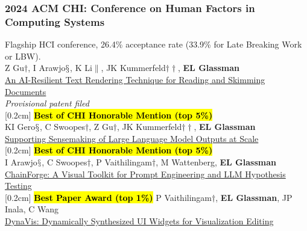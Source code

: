 \documentclass[10pt, a4paper]{article}
\newcommand{\years}[1]{\marginnote{\normalsize #1}}
\begin{document}

\subsubsection*{2024 ACM \textbf{CHI}: Conference on Human Factors in Computing Systems}
Flagship HCI conference, 26.4\% acceptance rate (33.9\% for Late Breaking Work or LBW).\\

\years{\textbf{C35}} Z Gu$\dagger$, I Arawjo$\mathsection$, K Li$\|$, JK Kummerfeld$\dagger\dagger$, \textbf{EL Glassman}\\ \href{https://glassmanlab.seas.harvard.edu/papers/gptsm.pdf}{An AI-Resilient Text Rendering Technique for Reading and Skimming Documents}\\
\textit{Provisional patent filed}\\
[0.2cm]
\years{\textbf{C34}}\hl{\textbf{Best of CHI Honorable Mention (top 5\%)}}\\ KI Gero$\mathsection$, C Swoopes$\dagger$, Z Gu$\dagger$, JK Kummerfeld$\dagger\dagger$, \textbf{EL Glassman}\\ \href{https://glassmanlab.seas.harvard.edu/papers/mesotext.pdf}{Supporting Sensemaking of Large Language Model Outputs at Scale}\\
[0.2cm]
\years{\textbf{C33}}\hl{\textbf{Best of CHI Honorable Mention (top 5\%)}}\\ I Arawjo$\mathsection$, C Swoopes$\dagger$, P Vaithilingam$\dagger$, M Wattenberg, \textbf{EL Glassman}\\ \href{https://glassmanlab.seas.harvard.edu/papers/chainforge.pdf}{ChainForge: A Visual Toolkit for Prompt Engineering and LLM Hypothesis Testing}\\
[0.2cm]
\years{\textbf{C32}}\hl{\textbf{Best Paper Award (top 1\%)}} P Vaithilingam$\dagger$, \textbf{EL Glassman}, JP Inala, C Wang\\ \href{https://glassmanlab.seas.harvard.edu/papers/dynavis.pdf}{DynaVis: Dynamically Synthesized UI Widgets for Visualization Editing}\\
\end{document}
